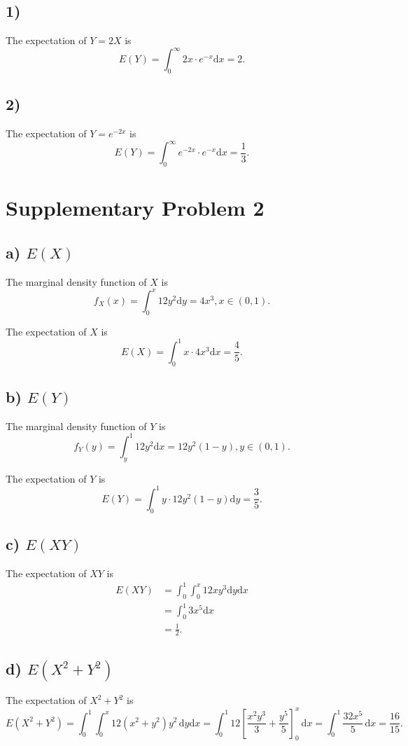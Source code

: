 \documentclass[a4paper, UTF-8]{article}
\theoremstyle{plain}
\begin{document}
\subsection{1)} 

The expectation of $Y = 2X$ is 
$$
E(Y) = \int_{0}^\infty 2x \cdot e^{-x} \mathrm{d}x = 2.
$$

\subsection{2)} 

The expectation of $Y = e^{-2x}$ is
$$
E(Y) = \int_{0}^\infty e^{-2x} \cdot e^{-x} \mathrm{d}x = \frac{1}{3}.
$$

\section{Supplementary Problem 2}

\subsection{a) $E(X)$} 

The marginal density function of $X$ is
$$
f_X(x) = \int_{0}^x 12y^2 \mathrm{d}y = 4x^3, x \in (0, 1).
$$

The expectation of $X$ is
$$
E(X) = \int_{0}^1 x \cdot 4x^3 \mathrm{d}x = \frac{4}{5}.
$$

\subsection{b) $E(Y)$} 

The marginal density function of $Y$ is
$$
f_Y(y) = \int_{y}^1 12y^2 \mathrm{d}x = 12y^2(1-y), y \in (0, 1).
$$

The expectation of $Y$ is
$$
E(Y) = \int_{0}^1 y \cdot 12y^2(1-y) \mathrm{d}y = \frac{3}{5}.
$$

\subsection{c) $E(XY)$} 

The expectation of $XY$ is
\begin{align*}
E(XY) & = \int_{0}^1 \int_{0}^x 12x y^3 \mathrm{d}y \mathrm{d}x \\
      & = \int_{0}^1 3x^5 \mathrm{d}x \\
      & = \frac{1}{2}.
\end{align*}

\subsection{d) $E(X^2 + Y^2)$} 

The expectation of $X^2 + Y^2$ is
$$
E(X^2+Y^2) = \int_{0}^1 \int_{0}^x 12(x^2 + y^2) y^2 \, \mathrm{d}y \mathrm{d}x
           = \int_{0}^1 12\left[\frac{x^2 y^3}{3} + \frac{y^5}{5}\right]_{0}^x \, \mathrm{d}x
           = \int_{0}^1 \frac{32x^5}{5} \, \mathrm{d}x
           = \frac{16}{15}.
$$
\end{document}
